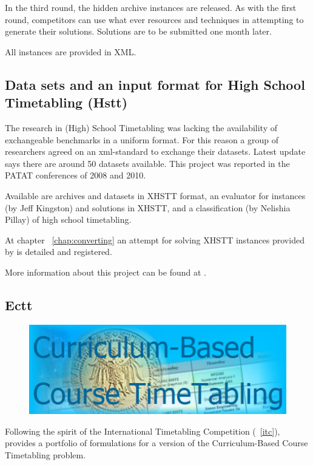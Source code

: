 In the third round, the hidden archive instances are released. As with the first round, competitors can use what ever resources and techniques in attempting to generate their solutions. Solutions are to be submitted one month later.

All instances are provided in XML.


\subsection{Data sets and an input format for High School Timetabling (Hstt)}
\label{hstt}

The research in (High) School Timetabling was lacking the availability of exchangeable benchmarks in a uniform format. For this reason a group of researchers agreed on an xml-standard to exchange their datasets. Latest update says there are around 50 datasets available. This project was reported in the PATAT conferences of 2008 and 2010.

Available are archives and datasets in XHSTT format, an evaluator for instances (by Jeff Kingston) and solutions in XHSTT, and a classification (by Nelishia Pillay) of high school timetabling.

At chapter ~\ref{chap:converting} an attempt for solving XHSTT instances provided by \cite{Hstt} is detailed and registered.

More information about this project can be found at \cite{Hstt}.


\subsection{Ectt}
\label{ectt}

\begin{figure}[ht]
\hfill\includegraphics[scale=0.4]{figures/ectt.png}
\end{figure}

Following the spirit of the International Timetabling Competition (~\ref{itc}), \cite{Ectt} provides a portfolio of formulations for a version of the Curriculum-Based Course Timetabling problem.

